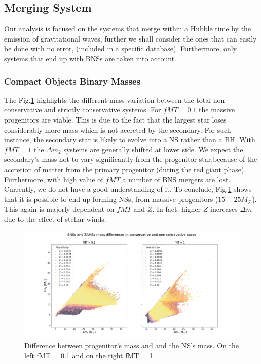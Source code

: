 \documentclass[preprint,12pt]{elsarticle}
\begin{document}
\subsection{\textbf{Merging System}}
Our analysis is focused on the systems that merge within a Hubble time by the emission of gravitational waves, further we shall consider the ones that can easily be done with no error, (included in a specific database). Furthermore, only systems that end up with BNSs are taken into account.

\subsubsection{\textbf{Compact Objects Binary Masses}}

The Fig.\ref{img:ZAMS_vs_NS} highlights the different mass variation between the total non conservative and strictly conservative systems. 
For $fMT = 0.1$ the massive progenitors are viable. This is due to the fact that the largest star loses considerably more mass which is not accreted by the secondary. For such instance, the secondary star is likely to evolve into a NS rather than a BH.
With $fMT = 1$ the $\Delta m_2$ systems are generally shifted at lower side. We expect the secondary's mass not to vary significantly from the progenitor star,because of the accretion of matter from the primary progenitor (during the red giant phase). Furthermore, with high value of $fMT$ a number of BNS mergers are lost. Currently, we do not have a good understanding of it. To conclude, Fig.\ref{img:ZAMS_vs_NS} shows that it is possible to end up forming NSs, from massive progenitors ($15 - 25M_{\odot}$). This again is majorly dependent on $fMT$ and $Z$. In fact, higher $Z$ increases $\Delta m$ due to the effect of stellar winds.

\begin{figure}[hb]
    \centering
    \includegraphics[width=1\textwidth]{Images/ZAMS_vs_BNSs.png}
    \caption{Difference between progenitor's mass and and the NS's mass. On the left fMT = 0.1 and on the right fMT = 1.}
    \label{img:ZAMS_vs_NS}
\end{figure}
\end{document}
